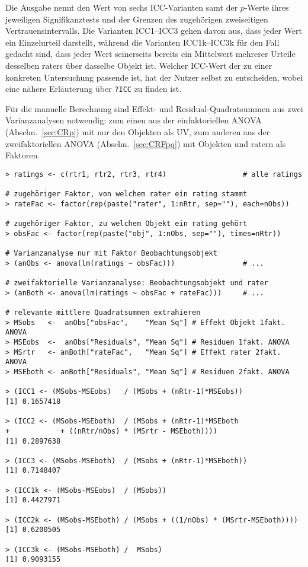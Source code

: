 Die Ausgabe nennt den Wert von sechs ICC-Varianten samt der $p$-Werte ihres jeweiligen Signifikanztests und der Grenzen des zugehörigen zweiseitigen Vertrauensintervalls. Die Varianten ICC1--ICC3 gehen davon aus, dass jeder Wert ein Einzelurteil darstellt, während die Varianten ICC1k--ICC3k für den Fall gedacht sind, dass jeder Wert seinerseits bereits ein Mittelwert mehrerer Urteile desselben raters über dasselbe Objekt ist. Welcher ICC-Wert der zu einer konkreten Untersuchung passende ist, hat der Nutzer selbst zu entscheiden, wobei eine nähere Erläuterung über \lstinline!?ICC! zu finden ist.

Für die manuelle Berechnung sind Effekt- und Residual-Quadratsummen aus zwei Varianzanalysen notwendig: zum einen aus der einfaktoriellen ANOVA (Abschn.\ \ref{sec:CRp}) mit nur den Objekten als UV, zum anderen aus der zweifaktoriellen ANOVA (Abschn.\ \ref{sec:CRFpq}) mit Objekten und ratern als Faktoren.
\begin{lstlisting}
> ratings <- c(rtr1, rtr2, rtr3, rtr4)                  # alle ratings

# zugehöriger Faktor, von welchem rater ein rating stammt
> rateFac <- factor(rep(paste("rater", 1:nRtr, sep=""), each=nObs))

# zugehöriger Faktor, zu welchem Objekt ein rating gehört
> obsFac <- factor(rep(paste("obj", 1:nObs, sep=""), times=nRtr))

# Varianzanalyse nur mit Faktor Beobachtungsobjekt
> (anObs <- anova(lm(ratings ~ obsFac)))                # ...

# zweifaktorielle Varianzanalyse: Beobachtungsobjekt und rater
> (anBoth <- anova(lm(ratings ~ obsFac + rateFac)))     # ...

# relevante mittlere Quadratsummen extrahieren
> MSobs   <-  anObs["obsFac",    "Mean Sq"] # Effekt Objekt 1fakt. ANOVA
> MSEobs  <-  anObs["Residuals", "Mean Sq"] # Residuen 1fakt. ANOVA
> MSrtr   <- anBoth["rateFac",   "Mean Sq"] # Effekt rater 2fakt. ANOVA
> MSEboth <- anBoth["Residuals", "Mean Sq"] # Residuen 2fakt. ANOVA

> (ICC1 <- (MSobs-MSEobs)   / (MSobs + (nRtr-1)*MSEobs))
[1] 0.1657418

> (ICC2 <- (MSobs-MSEboth)  / (MSobs + (nRtr-1)*MSEboth
+            + ((nRtr/nObs) * (MSrtr - MSEboth))))
[1] 0.2897638

> (ICC3 <- (MSobs-MSEboth)  / (MSobs + (nRtr-1)*MSEboth))
[1] 0.7148407

> (ICC1k <- (MSobs-MSEobs)  / (MSobs))
[1] 0.4427971

> (ICC2k <- (MSobs-MSEboth) / (MSobs + ((1/nObs) * (MSrtr-MSEboth))))
[1] 0.6200505

> (ICC3k <- (MSobs-MSEboth) /  MSobs)
[1] 0.9093155
\end{lstlisting}

